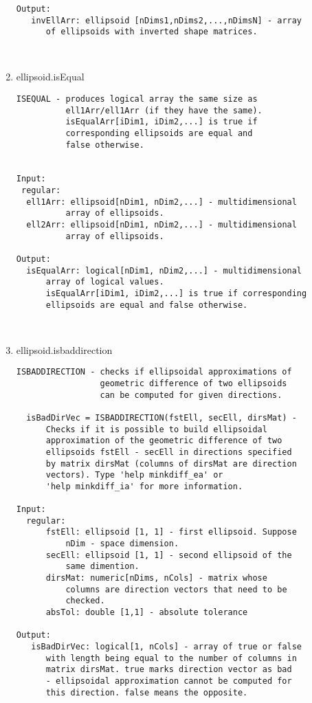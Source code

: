 \begin{enumerate}
\begin{lstlisting}
Output:
   invEllArr: ellipsoid [nDims1,nDims2,...,nDimsN] - array
      of ellipsoids with inverted shape matrices.



\end{lstlisting}
\fontfamily{\familydefault}
\selectfont
\item {ellipsoid.isEqual}
\selectfont
\begin{lstlisting}
ISEQUAL - produces logical array the same size as
          ell1Arr/ell1Arr (if they have the same).
          isEqualArr[iDim1, iDim2,...] is true if
          corresponding ellipsoids are equal and
          false otherwise.


Input:
 regular:
  ell1Arr: ellipsoid[nDim1, nDim2,...] - multidimensional
          array of ellipsoids.
  ell2Arr: ellipsoid[nDim1, nDim2,...] - multidimensional
          array of ellipsoids.

Output:
  isEqualArr: logical[nDim1, nDim2,...] - multidimensional
      array of logical values.
      isEqualArr[iDim1, iDim2,...] is true if corresponding
      ellipsoids are equal and false otherwise.



\end{lstlisting}
\fontfamily{\familydefault}
\selectfont
\item {ellipsoid.isbaddirection}
\selectfont
\begin{lstlisting}
ISBADDIRECTION - checks if ellipsoidal approximations of
                 geometric difference of two ellipsoids
                 can be computed for given directions.

  isBadDirVec = ISBADDIRECTION(fstEll, secEll, dirsMat) -
      Checks if it is possible to build ellipsoidal
      approximation of the geometric difference of two
      ellipsoids fstEll - secEll in directions specified
      by matrix dirsMat (columns of dirsMat are direction
      vectors). Type 'help minkdiff_ea' or
      'help minkdiff_ia' for more information.

Input:
  regular:
      fstEll: ellipsoid [1, 1] - first ellipsoid. Suppose
          nDim - space dimension.
      secEll: ellipsoid [1, 1] - second ellipsoid of the
          same dimention.
      dirsMat: numeric[nDims, nCols] - matrix whose
          columns are direction vectors that need to be
          checked.
      absTol: double [1,1] - absolute tolerance

Output:
   isBadDirVec: logical[1, nCols] - array of true or false
      with length being equal to the number of columns in
      matrix dirsMat. true marks direction vector as bad
      - ellipsoidal approximation cannot be computed for
      this direction. false means the opposite.


\end{lstlisting}
\end{enumerate}
